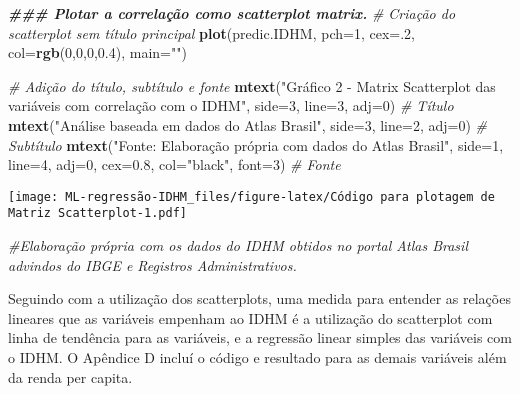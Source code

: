\documentclass[
]{article}
\newenvironment{Shaded}{\begin{snugshade}}{\end{snugshade}}
\newcommand{\AttributeTok}[1]{\textcolor[rgb]{0.13,0.29,0.53}{#1}}
\newcommand{\CommentTok}[1]{\textcolor[rgb]{0.56,0.35,0.01}{\textit{#1}}}
\newcommand{\DecValTok}[1]{\textcolor[rgb]{0.00,0.00,0.81}{#1}}
\newcommand{\DocumentationTok}[1]{\textcolor[rgb]{0.56,0.35,0.01}{\textbf{\textit{#1}}}}
\newcommand{\FloatTok}[1]{\textcolor[rgb]{0.00,0.00,0.81}{#1}}
\newcommand{\FunctionTok}[1]{\textcolor[rgb]{0.13,0.29,0.53}{\textbf{#1}}}
\newcommand{\NormalTok}[1]{#1}
\newcommand{\StringTok}[1]{\textcolor[rgb]{0.31,0.60,0.02}{#1}}
\begin{document}
\begin{Shaded}
\begin{Highlighting}[]
\DocumentationTok{\#\#\# Plotar a correlação como scatterplot matrix.}
\CommentTok{\# Criação do scatterplot sem título principal}
\FunctionTok{plot}\NormalTok{(predic.IDHM, }\AttributeTok{pch=}\DecValTok{1}\NormalTok{, }\AttributeTok{cex=}\NormalTok{.}\DecValTok{2}\NormalTok{, }\AttributeTok{col=}\FunctionTok{rgb}\NormalTok{(}\DecValTok{0}\NormalTok{,}\DecValTok{0}\NormalTok{,}\DecValTok{0}\NormalTok{,}\FloatTok{0.4}\NormalTok{), }\AttributeTok{main=}\StringTok{""}\NormalTok{)}

\CommentTok{\# Adição do título, subtítulo e fonte}
\FunctionTok{mtext}\NormalTok{(}\StringTok{"Gráfico 2 {-} Matrix Scatterplot das variáveis com correlação com o IDHM"}\NormalTok{, }\AttributeTok{side=}\DecValTok{3}\NormalTok{, }\AttributeTok{line=}\DecValTok{3}\NormalTok{, }\AttributeTok{adj=}\DecValTok{0}\NormalTok{) }\CommentTok{\# Título}
\FunctionTok{mtext}\NormalTok{(}\StringTok{"Análise baseada em dados do Atlas Brasil"}\NormalTok{, }\AttributeTok{side=}\DecValTok{3}\NormalTok{, }\AttributeTok{line=}\DecValTok{2}\NormalTok{, }\AttributeTok{adj=}\DecValTok{0}\NormalTok{) }\CommentTok{\# Subtítulo}
\FunctionTok{mtext}\NormalTok{(}\StringTok{"Fonte: Elaboração própria com dados do Atlas Brasil"}\NormalTok{, }\AttributeTok{side=}\DecValTok{1}\NormalTok{, }\AttributeTok{line=}\DecValTok{4}\NormalTok{, }\AttributeTok{adj=}\DecValTok{0}\NormalTok{, }\AttributeTok{cex=}\FloatTok{0.8}\NormalTok{, }\AttributeTok{col=}\StringTok{"black"}\NormalTok{, }\AttributeTok{font=}\DecValTok{3}\NormalTok{) }\CommentTok{\# Fonte}
\end{Highlighting}
\end{Shaded}

\texttt{[image: ML-regressão-IDHM\_files/figure-latex/Código para plotagem de Matriz Scatterplot-1.pdf]}

\begin{Shaded}
\begin{Highlighting}[]
\CommentTok{\#Elaboração própria com os dados do IDHM obtidos no portal Atlas Brasil advindos do IBGE e Registros Administrativos.}
\end{Highlighting}
\end{Shaded}

Seguindo com a utilização dos scatterplots, uma medida para entender as
relações lineares que as variáveis empenham ao IDHM é a utilização do
scatterplot com linha de tendência para as variáveis, e a regressão
linear simples das variáveis com o IDHM. O Apêndice D incluí o código e
resultado para as demais variáveis além da renda per capita.
\end{document}
